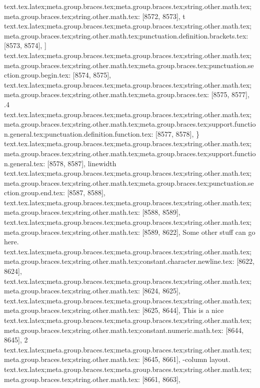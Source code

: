 {{{{{{{{{{{{{{{{{{{{{{{{{{{{{{{{{{{{{{{{{{{{{{{{{{{{{{{{{{{{{{{{{{{{{{{{{{{{{{{{{{{{{{{{{{{{{{{{{{{{{{{{{{{{{{{{{{{{{{{{{{{{{{{{{{{{{{{{{{{{{{{{{{{{{{{{{{{{{{{{{{{{{{{{{{{{{{{{{{{{{{{{{{{{{{{{{{{{{{{{{{{{{{{{{{{{{{{{{{{{{{{{{{{{{{{{{{{{{{{{{{{{{{{{{{{{{text.tex.latex;meta.group.braces.tex;meta.group.braces.tex;string.other.math.tex;meta.group.braces.tex;string.other.math.tex: [8572, 8573], {t}
text.tex.latex;meta.group.braces.tex;meta.group.braces.tex;string.other.math.tex;meta.group.braces.tex;string.other.math.tex;punctuation.definition.brackets.tex: [8573, 8574], {]}
text.tex.latex;meta.group.braces.tex;meta.group.braces.tex;string.other.math.tex;meta.group.braces.tex;string.other.math.tex;meta.group.braces.tex;punctuation.section.group.begin.tex: [8574, 8575], {{}
text.tex.latex;meta.group.braces.tex;meta.group.braces.tex;string.other.math.tex;meta.group.braces.tex;string.other.math.tex;meta.group.braces.tex: [8575, 8577], {.4}
text.tex.latex;meta.group.braces.tex;meta.group.braces.tex;string.other.math.tex;meta.group.braces.tex;string.other.math.tex;meta.group.braces.tex;support.function.general.tex;punctuation.definition.function.tex: [8577, 8578], {\}
text.tex.latex;meta.group.braces.tex;meta.group.braces.tex;string.other.math.tex;meta.group.braces.tex;string.other.math.tex;meta.group.braces.tex;support.function.general.tex: [8578, 8587], {linewidth}
text.tex.latex;meta.group.braces.tex;meta.group.braces.tex;string.other.math.tex;meta.group.braces.tex;string.other.math.tex;meta.group.braces.tex;punctuation.section.group.end.tex: [8587, 8588], {}}
text.tex.latex;meta.group.braces.tex;meta.group.braces.tex;string.other.math.tex;meta.group.braces.tex;string.other.math.tex: [8588, 8589], {
}
text.tex.latex;meta.group.braces.tex;meta.group.braces.tex;string.other.math.tex;meta.group.braces.tex;string.other.math.tex: [8589, 8622], {    Some other stuff can go here.}
text.tex.latex;meta.group.braces.tex;meta.group.braces.tex;string.other.math.tex;meta.group.braces.tex;string.other.math.tex;constant.character.newline.tex: [8622, 8624], {\\}
text.tex.latex;meta.group.braces.tex;meta.group.braces.tex;string.other.math.tex;meta.group.braces.tex;string.other.math.tex: [8624, 8625], {
}
text.tex.latex;meta.group.braces.tex;meta.group.braces.tex;string.other.math.tex;meta.group.braces.tex;string.other.math.tex: [8625, 8644], {    This is a nice }
text.tex.latex;meta.group.braces.tex;meta.group.braces.tex;string.other.math.tex;meta.group.braces.tex;string.other.math.tex;constant.numeric.math.tex: [8644, 8645], {2}
text.tex.latex;meta.group.braces.tex;meta.group.braces.tex;string.other.math.tex;meta.group.braces.tex;string.other.math.tex: [8645, 8661], {-column layout.
}
text.tex.latex;meta.group.braces.tex;meta.group.braces.tex;string.other.math.tex;meta.group.braces.tex;string.other.math.tex: [8661, 8663], {  }
}}}}}}}}}}}}}}}}}}}}}}}}}}}}}}}}}}}}}}}}}}}}}}}}}}}}}}}}}}}}}}}}}}}}}}}}}}}}}}}}}}}}}}}}}}}}}}}}}}}}}}}}}}}}}}}}}}}}}}}}}}}}}}}}}}}}}}}}}}}}}}}}}}}}}}}}}}}}}}}}}}}}}}}}}}}}}}}}}}}}}}}}}}}}}}}}}}}}}}}}}}}}}}}}}}}}}}}}}}}}}}}}}}}}}}}}}}}}}}}}}}}}}}}}}}}}}}
